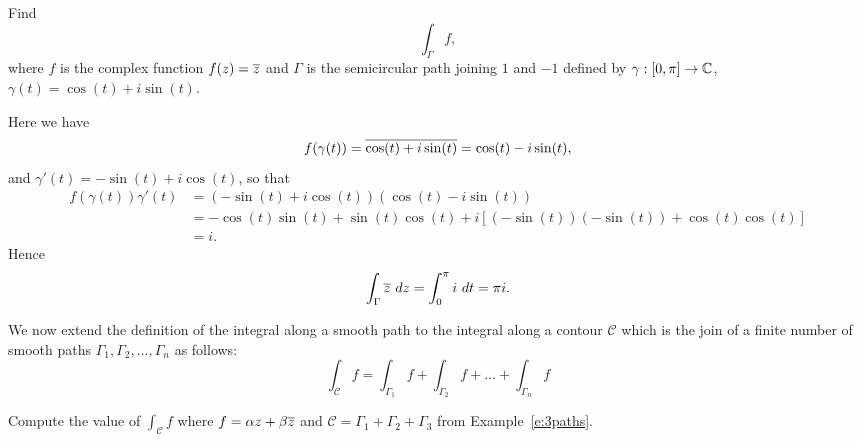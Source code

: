 \begin{example}
 Find
\[
\int_{\Gamma} f,
\]
where $f$ is the complex function $f(z)=\overline{z}$ and $\Gamma$ is the semicircular path joining $1$ and $-1$ defined by $\gamma : [0, \pi] \to \mathbb{C}$,  $\gamma(t)=\cos(t) + i \sin (t)$.
\end{example}
\begin{solution}
Here we have
\[
f(\gamma(t)) = \overline{\cos(t)+i\sin(t)} = \cos(t)-i \sin(t),
\]
and $\gamma'(t) = -\sin(t)+i \cos (t)$, so that
\begin{align*}
f(\gamma(t))\gamma '(t) &=  \left(-\sin(t)+i \cos (t) \right) \left( \cos(t)-i \sin(t) \right)\\
& = -\cos(t)\sin(t)+\sin(t)\cos(t) +i \left[ (-\sin(t))(-\sin(t))+\cos(t)\cos(t) \right] \\
& = i.
\end{align*}
Hence
\[
\int_{\Gamma} \overline{z}\ dz = \int_0^{\pi} i\ dt = \pi i.
\]
\end{solution}
We now extend the definition of the integral along a smooth path to the integral along a contour $\mathcal{C}$ which is the join of a finite number of smooth paths $\Gamma_1,\Gamma_2, \ldots , \Gamma_n$ as follows:
\[
\int_{\mathcal{C}} f = \int_{\Gamma_1} f + \int_{\Gamma_2} f + \ldots + \int_{\Gamma_n} f
\]
\begin{example}
\label{e:triangle}
Compute the value of $\int_{\mathcal{C}} f$ where $f=\alpha z + \beta \overline{z}$ and $\mathcal{C}=\Gamma_1 + \Gamma_2 + \Gamma_3$ from Example~\ref{e:3paths}.
\end{example}

